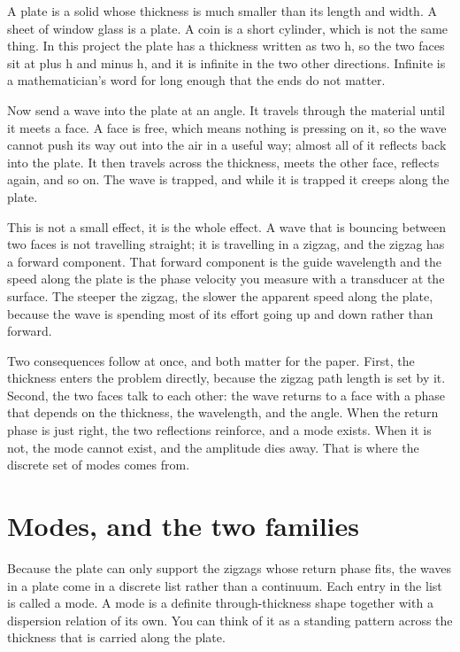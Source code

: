 \documentclass[11pt]{article}
\begin{document}
A plate is a solid whose thickness is much smaller than its length and width. A sheet of window glass is a
plate. A coin is a short cylinder, which is not the same thing. In this project the plate has a thickness
written as two h, so the two faces sit at plus h and minus h, and it is infinite in the two other
directions. Infinite is a mathematician's word for long enough that the ends do not matter.

Now send a wave into the plate at an angle. It travels through the material until it meets a face. A face is
free, which means nothing is pressing on it, so the wave cannot push its way out into the air in a useful
way; almost all of it reflects back into the plate. It then travels across the thickness, meets the other
face, reflects again, and so on. The wave is trapped, and while it is trapped it creeps along the plate.

This is not a small effect, it is the whole effect. A wave that is bouncing between two faces is not
travelling straight; it is travelling in a zigzag, and the zigzag has a forward component. That forward
component is the guide wavelength and the speed along the plate is the phase velocity you measure with a
transducer at the surface. The steeper the zigzag, the slower the apparent speed along the plate, because the
wave is spending most of its effort going up and down rather than forward.

Two consequences follow at once, and both matter for the paper. First, the thickness enters the problem
directly, because the zigzag path length is set by it. Second, the two faces talk to each other: the wave
returns to a face with a phase that depends on the thickness, the wavelength, and the angle. When the return
phase is just right, the two reflections reinforce, and a mode exists. When it is not, the mode cannot exist,
and the amplitude dies away. That is where the discrete set of modes comes from.

\section{Modes, and the two families}

Because the plate can only support the zigzags whose return phase fits, the waves in a plate come in a
discrete list rather than a continuum. Each entry in the list is called a mode. A mode is a definite
through-thickness shape together with a dispersion relation of its own. You can think of it as a standing
pattern across the thickness that is carried along the plate.
\end{document}
